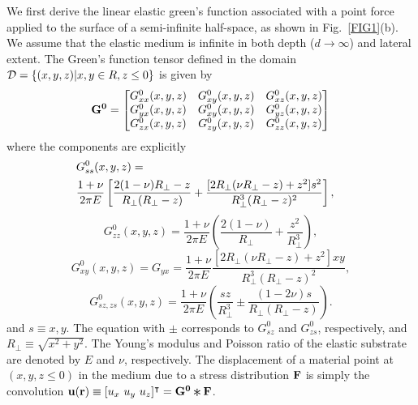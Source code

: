 \documentclass[aps,prl,reprint,twocolumn,groupedaddress,showpacs]{revtex4-1}
\def\r{{\bf r}}
\def\u{{\bf u}}
\def\F{{\bf F}}
\def\F{{\bf F}}
\newcommand{\Conv}{\mathop{\scalebox{1.5}{\raisebox{-0.2ex}{$\ast$}}}}%
\begin{document}
We first derive the linear elastic green's function associated with a
point force applied to the surface of a semi-infinite half-space, as
shown in Fig.~\ref{FIG1}(b). We assume that the elastic medium is
infinite in both depth ($d\to \infty$) and lateral extent. The Green's
function tensor defined in the domain ${\cal D}=\left\{(x,y,z)|x,y\in
R,z\leq0\right\}$ is given by
\begin{equation}
{\bf G^0} = \left[ \begin{matrix} G^0_{xx}(x,y,z) & G^0_{xy}(x,y,z) & G^0_{xz}(x,y,z) \\
	G^0_{yx}(x,y,z) & G^0_{xy}(x,y,z) & G^0_{yz}(x,y,z) \\
	G^0_{zx}(x,y,z) & G^0_{zy}(x,y,z) & G^0_{zz}(x,y,z) 
 \end{matrix} \right]
\end{equation}
where the components are explicitly \cite{LANDAU}
%
\begin{align}
\lefteqn{G^0_{ss}(x,y,z) = }\nonumber\\
&\frac{1+\nu}{2\pi E}\left[\frac{2(1-\nu)R_{\perp}-z}{R_{\perp}(R_{\perp}-z)} + 
\frac{[2R_{\perp}(\nu R_{\perp}-z)+z^{2}]s^{2}}{R_{\perp}^{3}(R_{\perp}-z)^{2}}\right],
\end{align}
\begin{equation}
G^0_{zz}(x,y,z) =\frac{1+\nu}{2\pi E}\left(\frac{2(1-\nu)}{R_{\perp}}+\frac{z^{2}}{R_{\perp}^{3}}\right),
\label{eq:Gzz0}
\end{equation}
\begin{equation} 
G^0_{xy}(x,y,z) = G_{yx}=\frac{1+\nu}{2\pi E}\frac{[2R_{\perp}(\nu R_{\perp}-z)+z^{2}]xy}{R_{\perp}^{3}
(R_{\perp}-z)^{2}},
\label{eq:Gxy0}
\end{equation}
\begin{equation}
G^0_{sz, zs}(x,y,z) =\frac{1+\nu}{2\pi E}\left(\frac{sz}{R_{\perp}^{3}}\pm\frac{(1-2\nu)s}{R_{\perp}
(R_{\perp}-z)}\right).
\end{equation}
%
and $s\equiv x,y$. The equation with $\pm$ corresponds to $G^0_{sz}$
and $G^0_{zs}$, respectively, and $R_{\perp} \equiv \sqrt{x^{2}
  +y^{2}}$. The Young's modulus and Poisson ratio of the elastic
substrate are denoted by $E$ and $\nu$, respectively.  The
displacement of a material point at $(x,y,z\leq 0)$ in the medium due
to a stress distribution ${\bf F}$ is simply the convolution $\u(\r)
\equiv [u_x \ u_y\ u_z]^\intercal = {\bf G^0}\Conv\F$.
\end{document}
